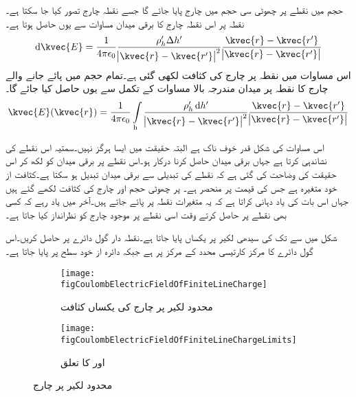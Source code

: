 حجم میں   نقطے پر چھوٹی سی حجم  میں  چارج پایا جائے گا جسے نقطہ چارج تصور کیا جا سکتا ہے۔نقطہ  پر اس نقطہ چارج کا برقی میدان  مساوات  سے یوں حاصل ہوتا ہے۔
\begin{align*}
\dif \kvec{E}=\frac{1}{4 \pi \epsilon_0 }\frac{\rho_h' \Delta h'}{\abs{\kvec{r}-\kvec{r'}}^2} \frac{\kvec{r}-\kvec{r'}}{\abs{\kvec{r}-\kvec{r'}}}
\end{align*}
اس مساوات میں  نقطہ  پر چارج کی کثافت  لکھی گئی ہے۔تمام حجم میں پائے جانے والے چارج کا نقطہ  پر میدان مندرجہ بالا مساوات کے تکمل سے یوں حاصل کیا جائے گا۔
\begin{align}\label{مساوات_کولومب_حجم_چارج_کا_میدان}
\kvec{E}(\kvec{r})=\frac{1}{4 \pi \epsilon_0 }\int\limits_{\textrm{h}}\frac{\rho_h'  \dif h'}{\abs{\kvec{r}-\kvec{r'}}^2} \frac{\kvec{r}-\kvec{r'}}{\abs{\kvec{r}-\kvec{r'}}}
\end{align}

اس مساوات کی  شکل قدر خوف ناک  ہے البتہ حقیقت میں ایسا ہرگز نہیں۔سمتیہ  اس نقطے کی نشاندہی کرتا ہے جہاں برقی میدان حاصل کرنا درکار ہو۔اس نقطے پر برقی میدان
 کو   لکھ کر اس حقیقت کی وضاحت کی گئی ہے کہ نقطے کی تبدیلی سے برقی میدان تبدیل ہو سکتا ہے۔کثافت از خود  متغیرہ ہے جس کی قیمت  پر منحصر ہے۔  پر چھوٹی حجم  اور چارج کی کثافت  لکھے گئے ہیں جہاں  اس بات کی یاد دہانی کراتا ہے کہ یہ متغیرات نقطہ  پر پائے جاتے ہیں۔آخر میں یاد رہے کہ کسی بھی نقطے پر  حاصل کرتے وقت اسی نقطے پر موجود چارج کو نظرانداز کیا جاتا ہے۔

شکل  میں  سے  تک کی سیدھی لکیر پر  یکساں  پایا جاتا ہے۔نقطہ دار گول دائرے پر  حاصل کریں۔اس گول دائرے کا مرکز  کارتیسی محدد کے مرکز  پر ہے جبکہ دائرہ از خود  سطح پر پایا جاتا ہے۔ 
\begin{figure}
\begin{subfigure}{0.5\textwidth}
\centering
\texttt{[image: figCoulombElectricFieldOfFiniteLineCharge]}
\caption{محدود لکیر پر چارج کی یکساں کثافت}
\end{subfigure}
%
\begin{subfigure}{0.5\textwidth}
\centering
\texttt{[image: figCoulombElectricFieldOfFiniteLineChargeLimits]}
\caption{ اور  کا تعلق}
\end{subfigure}
\caption{محدود لکیر پر چارج}
\label{شکل_کولومب_محدود_لکیر_پر_چارج}
\end{figure}

